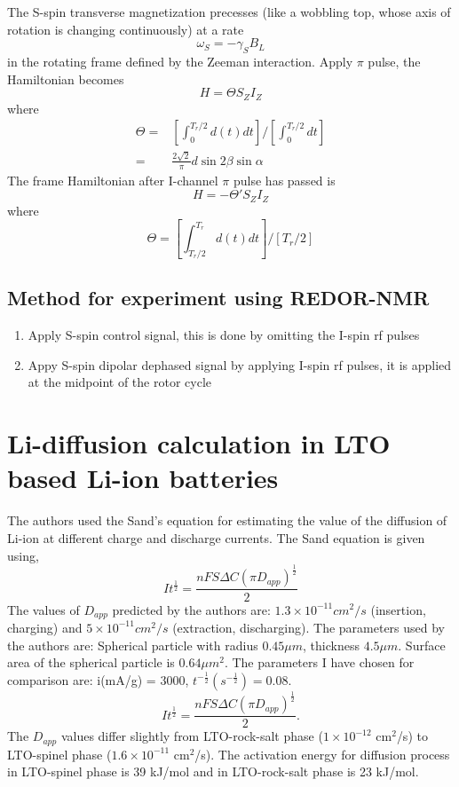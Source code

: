 \documentclass[12pt]{book}
\begin{document}
The S-spin transverse magnetization precesses (like a wobbling top,
whose axis of rotation is changing continuously) at a rate
\[
\omega_{S}=-\gamma_{S}B_{L}
\]
in the rotating frame defined by the Zeeman interaction. Apply $\pi$
pulse, the Hamiltonian becomes 
\[
H=\Theta S_{Z}I_{Z}
\]
where 
\begin{align*}
\Theta= & \left[\int_{0}^{T_{r}/2}d\left(t\right)dt\right]/\left[\int_{0}^{T_{r}/2}dt\right]\\
= & \frac{2\sqrt{2}}{\pi}d\sin2\beta\sin\alpha
\end{align*}
The frame Hamiltonian after I-channel $\pi$ pulse has passed is 
\[
H=-\Theta'S_{Z}I_{Z}
\]
where 
\[
\Theta=\left[\int_{T_{r}/2}^{T_{r}}d\left(t\right)dt\right]/\left[T_{r}/2\right]
\]


\subsection{Method for experiment using REDOR-NMR}
\begin{enumerate}
	\item Apply S-spin control signal, this is done by omitting the I-spin rf
	pulses
	\item Appy S-spin dipolar dephased signal by applying I-spin rf pulses,
	it is applied at the midpoint of the rotor cycle
\end{enumerate}

\section{Li-diffusion calculation in LTO based Li-ion batteries}

The authors used the Sand's equation for estimating the value of the
diffusion of Li-ion at different charge and discharge currents. The
Sand equation is given using, 
\[
It^{\frac{1}{2}}=\frac{nFS\Delta C\left(\pi D_{app}\right)^{\frac{1}{2}}}{2}
\]
The values of $D_{app}$ predicted by the authors are: $1.3\times10^{-11}cm^{2}/s$
(insertion, charging) and $5\times10^{-11}cm^{2}/s$ (extraction,
discharging). The parameters used by the authors are: Spherical particle
with radius $0.45\mu m$, thickness $4.5\mu m$. Surface area of the
spherical particle is $0.64\mu m^{2}$. The parameters I have chosen
for comparison are: i(mA/g) = $3000$, $t^{-\frac{1}{2}}\left(s^{-\frac{1}{2}}\right)=0.08$.
\[
It^{\frac{1}{2}}=\frac{nFS\Delta C\left(\pi D_{app}\right)^{\frac{1}{2}}}{2}.
\]
The $D_{app}$ values differ slightly from LTO-rock-salt phase ($1\times10^{-12}$
cm$^{2}$/s) to LTO-spinel phase ($1.6\times10^{-11}$ cm$^{2}$/s).
The activation energy for diffusion process in LTO-spinel phase is
39 kJ/mol and in LTO-rock-salt phase is 23 kJ/mol.
\end{document}
